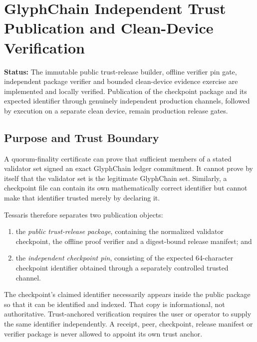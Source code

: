 
\section{GlyphChain Independent Trust Publication and Clean-Device Verification}
\label{sec:glyphchain-independent-trust-publication}

\noindent\textbf{Status:} The immutable public trust-release builder, offline
verifier pin gate, independent package verifier and bounded clean-device
evidence exercise are implemented and locally verified.  Publication of the
checkpoint package and its expected identifier through genuinely independent
production channels, followed by execution on a separate clean device, remain
production release gates.

\subsection{Purpose and Trust Boundary}

A quorum-finality certificate can prove that sufficient members of a stated
validator set signed an exact GlyphChain ledger commitment.  It cannot prove by
itself that the validator set is the legitimate GlyphChain set.  Similarly, a
checkpoint file can contain its own mathematically correct identifier but cannot
make that identifier trusted merely by declaring it.

Tessaris therefore separates two publication objects:

\begin{enumerate}[leftmargin=*]
  \item the \emph{public trust-release package}, containing the normalized
        validator checkpoint, the offline proof verifier and a digest-bound
        release manifest; and
  \item the \emph{independent checkpoint pin}, consisting of the expected
        64-character checkpoint identifier obtained through a separately
        controlled trusted channel.
\end{enumerate}

The checkpoint's claimed identifier necessarily appears inside the public
package so that it can be identified and indexed.  That copy is informational,
not authoritative.  Trust-anchored verification requires the user or operator
to supply the same identifier independently.  A receipt, peer, checkpoint,
release manifest or verifier package is never allowed to appoint its own trust
anchor.

